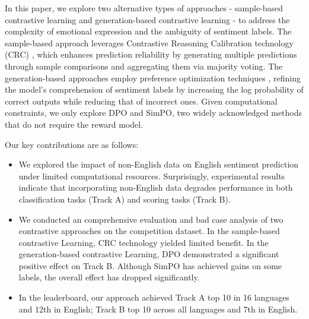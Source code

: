 \documentclass[11pt]{article}
\begin{document}

In this paper, we explore two alternative types of approaches - sample-based contrastive learning and generation-based contrastive learning - to address the complexity of emotional expression and the ambiguity of sentiment labels. The sample-based approach leverages Contrastive Reasoning Calibration technology (CRC) \cite{li2024chinchunmei}, which enhances prediction reliability by generating multiple predictions through sample comparisons and aggregating them via majority voting. The generation-based approaches employ preference optimization techniques \cite{rafailov2023direct, hong2024orpo, meng2025simpo}, refining the model’s comprehension of sentiment labels by increasing the log probability of correct outputs while reducing that of incorrect ones. Given computational constraints, we only explore DPO \cite{rafailov2023direct} and SimPO\cite{meng2025simpo}, two widely acknowledged methods that do not require the reward model.



Our key contributions are as follows:

\begin{itemize}
	\item We explored the impact of non-English data on English sentiment prediction under limited computational resources. Surprisingly, experimental results indicate that incorporating non-English data degrades performance in both classification tasks (Track A) and scoring tasks (Track B).
	\item We conducted an comprehensive evaluation and bad case analysis of two contrastive approaches on the competition dataset. In the sample-based contrastive Learning, CRC technology yielded limited benefit. In the generation-based contrastive Learning, DPO demonstrated a significant positive effect on Track B. Although SimPO has achieved gains on some labels, the overall effect has dropped significantly. 
	\item In the leaderboard, our approach achieved Track A top 10 in 16 languages and 12th in English; Track B top 10 across all languages and 7th in English.
\end{itemize}
\end{document}
